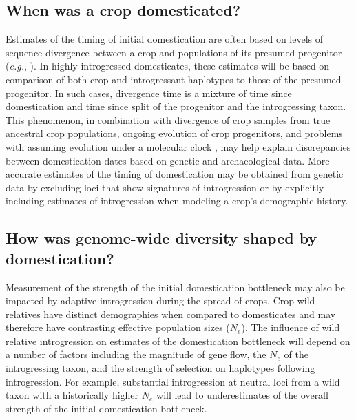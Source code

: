 \documentclass[11pt]{article}
\begin{document}
\subsection*{When was a crop domesticated?}
Estimates of the timing of initial domestication are often based on levels of sequence divergence between a crop and populations of its presumed progenitor (\emph{e.g.}, \cite{matsuoka2002single, molina2011molecular}).
In highly introgressed domesticates, these estimates will be based on comparison of both crop and introgressant haplotypes to those of the presumed progenitor.
In such cases, divergence time is a mixture of time since domestication and time since split of the progenitor and the introgressing taxon.
This phenomenon, in combination with divergence of crop samples from true ancestral crop populations, ongoing evolution of crop progenitors, and problems with assuming evolution under a molecular clock \cite{Zeder2006}, may help explain discrepancies between domestication dates based on genetic and archaeological data.
More accurate estimates of the timing of domestication may be obtained from genetic data by excluding loci that show signatures of introgression or by explicitly including estimates of introgression when modeling a crop's demographic history.

\subsection*{How was genome-wide diversity shaped by domestication?}

Measurement of the strength of the initial domestication bottleneck may also be impacted by adaptive introgression during the spread of crops.
Crop wild relatives have distinct demographies when compared to domesticates and may therefore have contrasting effective population sizes ($N_e$).
The influence of wild relative introgression on estimates of the domestication bottleneck will depend on a number of factors including the magnitude of gene flow, the $N_e$ of the introgressing taxon, and the strength of selection on haplotypes following introgression.
For example, substantial introgression at neutral loci from a wild taxon with a historically higher $N_e$ will lead to underestimates of the overall strength of the initial domestication bottleneck.
\end{document}
